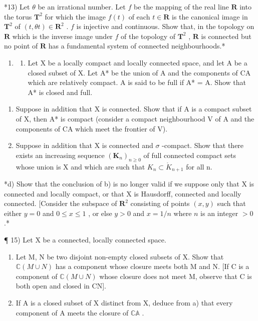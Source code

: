 *13) Let \(\theta\) be an irrational number. Let \(f\) be the mapping of the real line \(\mathbf{R}\) into the torus \(\mathbf{T}^2\) for which the image \(f(t)\) of each \(t \in \mathbf{R}\) is the canonical image in \(\mathbf{T}^2\) of \((t, \theta t) \in \mathbf{R}^2\) . \(f\) is injective and continuous. Show that, in the topology on \(\mathbf{R}\) which is the inverse image under \(f\) of the topology of \(\mathbf{T}^2\) , \(\mathbf{R}\) is connected but no point of \(\mathbf{R}\) has a fundamental system of connected neighbourhoods.*

\begin{enumerate}
\def\labelenumi{\arabic{enumi})}
\setcounter{enumi}{13}
\tightlist
\item
  \begin{enumerate}
  \def\labelenumii{\alph{enumii})}
  \tightlist
  \item
    Let X be a locally compact and locally connected space, and let A be a closed subset of X. Let A* be the union of A and the components of CA which are relatively compact. A is said to be full if A* = A. Show that A* is closed and full.
  \end{enumerate}
\end{enumerate}

\begin{enumerate}
\def\labelenumi{\alph{enumi})}
\setcounter{enumi}{1}
\item
  Suppose in addition that X is connected. Show that if A is a compact subset of X, then A* is compact (consider a compact neighbourhood V of A and the components of CA which meet the frontier of V).
\item
  Suppose in addition that X is connected and \(\sigma\) -compact. Show that there exists an increasing sequence \((\mathbf{K}_{n})_{n\geqslant0}\) of full connected compact sets whose union is X and which are such that \(K_{n}\subset\mathring{K}_{n+1}\) for all n.
\end{enumerate}

*d) Show that the conclusion of b) is no longer valid if we suppose only that X is connected and locally compact, or that X is Hausdorff, connected and locally connected. {[}Consider the subspace of \(\mathbf{R}^2\) consisting of points \((x, y)\) such that either \(y = 0\) and \(0 \leqslant x \leqslant 1\) , or else \(y > 0\) and \(x = 1/n\) where \(n\) is an integer \(> 0\) .*

¶ 15) Let X be a connected, locally connected space.

\begin{enumerate}
\def\labelenumi{\alph{enumi})}
\item
  Let M, N be two disjoint non-empty closed subsets of X. Show that \(\mathbb{C}(M \cup N)\) has a component whose closure meets both M and N. {[}If C is a component of \(\mathbb{C}(M \cup N)\) whose closure does not meet M, observe that C is both open and closed in CN{]}.
\item
  If A is a closed subset of X distinct from X, deduce from a) that every component of A meets the closure of \(\mathbb{C}\mathbb{A}\) .
\end{enumerate}

